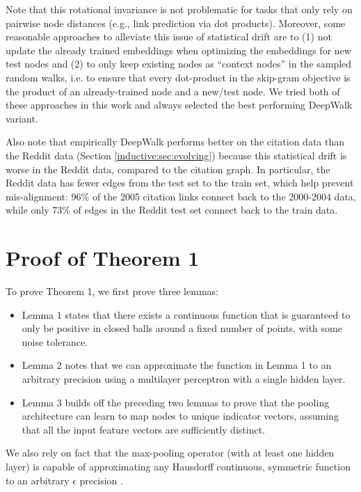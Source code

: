 Note that this rotational invariance is not problematic for tasks that only rely on pairwise node distances (e.g., link prediction via dot products). 
Moreover, some reasonable approaches to alleviate this issue of statistical drift are to (1) not update the already trained embeddings when optimizing the embeddings for new test nodes and (2) to only keep existing nodes as ``context nodes'' in the sampled random walks, i.e. to ensure that every dot-product in the skip-gram objective is the product of an already-trained node and a new/test node.
We tried both of these approaches in this work and always selected the best performing DeepWalk variant. 

Also note that empirically DeepWalk performs better on the citation data than the Reddit data (Section \ref{inductive:sec:evolving}) because this statistical drift is worse in the Reddit data, compared to the citation graph.
In particular, the Reddit data has fewer edges from the test set to the train set, which help prevent mis-alignment: 96\% of the 2005 citation links connect back to the 2000-2004 data, while only 73\% of edges in the Reddit test set connect back to the train data. 

\section{Proof of Theorem 1}

\newcommand{\R}{\mathbb{R}}
To prove Theorem 1, we first prove three lemmas:
\begin{itemize}
\item
Lemma 1 states that there exists a continuous function that is guaranteed to only be positive in closed balls around a fixed number of points, with some noise tolerance. 
\item
Lemma 2 notes that we can approximate the function in Lemma 1 to an arbitrary precision using a multilayer perceptron with a single hidden layer.
\item
Lemma 3 builds off the preceding two lemmas to prove that the pooling architecture can learn to map nodes to unique indicator vectors, assuming that all the input feature vectors are sufficiently distinct. 
\end{itemize}
We also rely on fact that the max-pooling operator (with at least one hidden layer) is capable of approximating any Hausdorff continuous, symmetric function to an arbitrary $\epsilon$ precision \cite{qi2016pointnet}.

